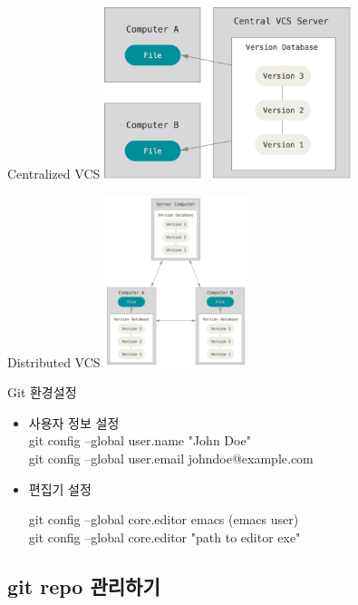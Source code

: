 \documentclass{beamer}
\begin{document}
\begin{frame}{Centralized VCS}
\includegraphics[height=5cm,keepaspectratio]{centralized}
\end{frame}

\begin{frame}{Distributed VCS}
\includegraphics[height=5cm,keepaspectratio]{distributed}
\end{frame}





\begin{frame}{Git 환경설정}
\begin{itemize} 
\item 사용자 정보 설정 \\
 git config --global user.name "John Doe" \\
 git config --global user.email johndoe@example.com

\item 편집기 설정 

 git config --global core.editor emacs (emacs user) \\
 git config --global core.editor "path to editor exe"

\end{itemize}
\end{frame}


\subsection{git repo 관리하기}
\end{document}
